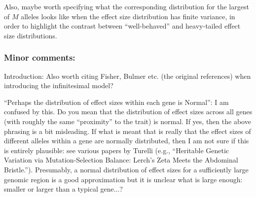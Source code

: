 
\begin{point}{}
Also, maybe worth specifying what the corresponding distribution for the largest of $M$ alleles looks like when the effect size distribution has finite variance, in order to highlight the contrast between ``well-behaved'' and heavy-tailed effect size distributions.
\end{point}


\subsubsection*{Minor comments:}

\begin{point}{}
    Introduction: Also worth citing Fisher, Bulmer etc. (the original references) when introducing the infinitesimal model?
\end{point}


\begin{point}{\revref}
    ``Perhaps the distribution of effect sizes within each gene is Normal'': I am confused by this. Do you mean that the distribution of effect sizes across all genes (with roughly the same ``proximity'' to the trait) is normal. If yes, then the above phrasing is a bit misleading. If what is meant that is really that the effect sizes of different alleles within a gene are normally distributed, then I am not sure if this is entirely plausible: see various papers by Turelli (e.g., ``Heritable Genetic Variation via Mutation-Selection Balance: Lerch's Zeta Meets the Abdominal Bristle.''). Presumably, a normal distribution of effect sizes for a sufficiently large genomic region is a good approximation but it is unclear what is large enough: smaller or larger than a typical gene...?
\end{point}

